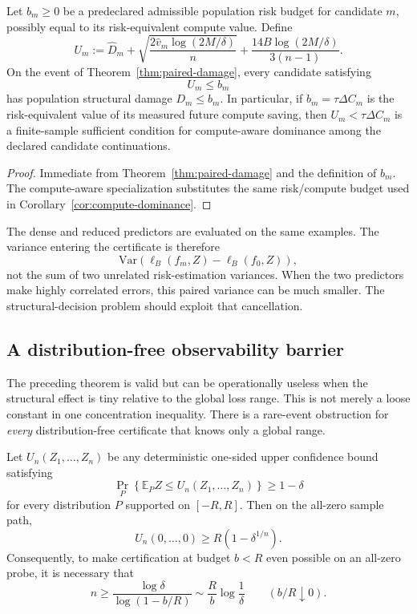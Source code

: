 \begin{corollary}\label{cor:paired-safe}
Let $b_m\ge0$ be a predeclared admissible population risk budget for candidate $m$, possibly equal to its risk-equivalent compute value. Define
\[
U_m
:=
\widehat D_m
+
\sqrt{\frac{2\widehat v_m\log(2M/\delta)}{n}}
+
\frac{14B\log(2M/\delta)}{3(n-1)}.
\]
On the event of Theorem~\ref{thm:paired-damage}, every candidate satisfying
\[
\boxed{U_m\le b_m}
\]
has population structural damage $D_m\le b_m$. In particular, if $b_m=\tau\Delta C_m$ is the risk-equivalent value of its measured future compute saving, then $U_m<\tau\Delta C_m$ is a finite-sample sufficient condition for compute-aware dominance among the declared candidate continuations.
\end{corollary}

\begin{proof}
Immediate from Theorem~\ref{thm:paired-damage} and the definition of $b_m$. The compute-aware specialization substitutes the same risk/compute budget used in Corollary~\ref{cor:compute-dominance}.
\end{proof}

\begin{remark}
The dense and reduced predictors are evaluated on the same examples. The variance entering the certificate is therefore
\[
\mathrm{Var}\!\left(\ell_B(f_m,Z)-\ell_B(f_0,Z)\right),
\]
not the sum of two unrelated risk-estimation variances. When the two predictors make highly correlated errors, this paired variance can be much smaller. The structural-decision problem should exploit that cancellation.
\end{remark}

\subsection{A distribution-free observability barrier}
The preceding theorem is valid but can be operationally useless when the structural effect is tiny relative to the global loss range. This is not merely a loose constant in one concentration inequality. There is a rare-event obstruction for \emph{every} distribution-free certificate that knows only a global range.

\begin{proposition}\label{prop:range-barrier}
Let $U_n(Z_1,\ldots,Z_n)$ be any deterministic one-sided upper confidence bound satisfying
\[
\Pr_P\!\left\{\mathbb E_P Z\le U_n(Z_1,\ldots,Z_n)\right\}\ge1-\delta
\]
for every distribution $P$ supported on $[-R,R]$. Then on the all-zero sample path,
\[
\boxed{
U_n(0,\ldots,0)
\ge
R\left(1-\delta^{1/n}\right).
}
\]
Consequently, to make certification at budget $b<R$ even possible on an all-zero probe, it is necessary that
\[
\boxed{
n\ge
\frac{\log\delta}{\log(1-b/R)}
\sim
\frac{R}{b}\log\frac1\delta
\qquad (b/R\downarrow0).
}
\]
\end{proposition}

